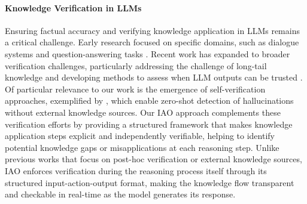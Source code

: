 \paragraph{Knowledge Verification in LLMs}
Ensuring factual accuracy and verifying knowledge application in LLMs remains a critical challenge. Early research focused on specific domains, such as dialogue systems \cite{shuster2021retrieval} and question-answering tasks \cite{kadavath2022language,kandpal2023large}. Recent work has expanded to broader verification challenges, particularly addressing the challenge of long-tail knowledge \cite{kandpal2023large} and developing methods to assess when LLM outputs can be trusted \cite{mallen2022not}. Of particular relevance to our work is the emergence of self-verification approaches, exemplified by \cite{manakul2023selfcheckgpt}, which enable zero-shot detection of hallucinations without external knowledge sources. Our IAO approach complements these verification efforts by providing a structured framework that makes knowledge application steps explicit and independently verifiable, helping to identify potential knowledge gaps or misapplications at each reasoning step. Unlike previous works that focus on post-hoc verification or external knowledge sources, IAO enforces verification during the reasoning process itself through its structured input-action-output format, making the knowledge flow transparent and checkable in real-time as the model generates its response.